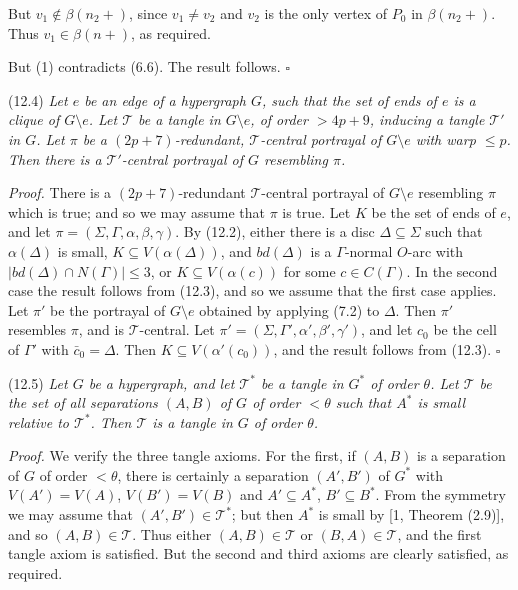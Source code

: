 But $v_1 \notin \beta(n_2 +)$, since $v_1 \ne v_2$ and $v_2$ is the only vertex of $P_0$ in $\beta(n_2 +)$. Thus $v_1 \in \beta(n +)$, as required.

But (1) contradicts (6.6). The result follows. $\square$

\stmt
(12.4) \textit{Let $e$ be an edge of a hypergraph $G$, such that the set of ends of $e$ is a clique of $G \setminus e$. Let $\mathscr{T}$ be a tangle in $G \setminus e$, of order $>4p+9$, inducing a tangle $\mathscr{T}'$ in $G$. Let $\pi$ be a $(2p+7)$-redundant, $\mathscr{T}$-central portrayal of $G \setminus e$ with warp $\le p$. Then there is a $\mathscr{T}'$-central portrayal of $G$ resembling $\pi$.}

\textit{Proof.} There is a $(2p+7)$-redundant $\mathscr{T}$-central portrayal of $G \setminus e$ resembling $\pi$ which is true; and so we may assume that $\pi$ is true. Let $K$ be the set of ends of $e$, and let $\pi = (\Sigma, \Gamma, \alpha, \beta, \gamma)$. By (12.2), either there is a disc $\Delta \subseteq \Sigma$ such that $\alpha(\Delta)$ is small, $K \subseteq V(\alpha(\Delta))$, and $bd(\Delta)$ is a $\Gamma$-normal $O$-arc with $|bd(\Delta) \cap N(\Gamma)| \le 3$, or $K \subseteq V(\alpha(c))$ for some $c \in C(\Gamma)$. In the second case the result follows from (12.3), and so we assume that the first case applies. Let $\pi'$ be the portrayal of $G \setminus e$ obtained by applying (7.2) to $\Delta$. Then $\pi'$ resembles $\pi$, and is $\mathscr{T}$-central. Let $\pi' = (\Sigma, \Gamma', \alpha', \beta', \gamma')$, and let $c_0$ be the cell of $\Gamma'$ with $\bar{c}_0 = \Delta$. Then $K \subseteq V(\alpha'(c_0))$, and the result follows from (12.3). $\square$

\stmt
(12.5) \textit{Let $G$ be a hypergraph, and let $\mathscr{T}^*$ be a tangle in $G^*$ of order $\theta$. Let $\mathscr{T}$ be the set of all separations $(A, B)$ of $G$ of order $<\theta$ such that $A^*$ is small relative to $\mathscr{T}^*$. Then $\mathscr{T}$ is a tangle in $G$ of order $\theta$.}

\textit{Proof.} We verify the three tangle axioms. For the first, if $(A, B)$ is a separation of $G$ of order $<\theta$, there is certainly a separation $(A', B')$ of $G^*$ with $V(A') = V(A)$, $V(B') = V(B)$ and $A' \subseteq A^*$, $B' \subseteq B^*$. From the symmetry we may assume that $(A', B') \in \mathscr{T}^*$; but then $A^*$ is small by [1, Theorem (2.9)], and so $(A, B) \in \mathscr{T}$. Thus either $(A, B) \in \mathscr{T}$ or $(B, A) \in \mathscr{T}$, and the first tangle axiom is satisfied. But the second and third axioms are clearly satisfied, as required.


